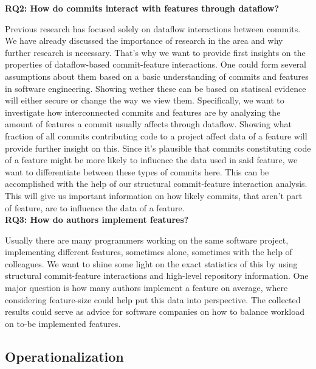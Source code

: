 \textbf{RQ2: How do commits interact with features through dataflow?}

Previous research has focused solely on dataflow interactions between commits.
We have already discussed the importance of research in the area and why further research is necessary.
That's why we want to provide first insights on the properties of dataflow-based commit-feature interactions.
One could form several assumptions about them based on a basic understanding of commits and features in software engineering.
Showing wether these can be based on statiscal evidence will either secure or change the way we view them.
Specifically, we want to investigate how interconnected commits and features are by analyzing the amount of features a commit usually affects through dataflow.
Showing what fraction of all commits contributing code to a project affect data of a feature will provide further insight on this. 
Since it's plausible that commits constituting code of a feature might be more likely to influence the data used in said feature, we want to differentiate between these types of commits here.
This can be accomplished with the help of our structural commit-feature interaction analysis. 
This will give us important information on how likely commits, that aren't part of feature, are to influence the data of a feature. \\

\textbf{RQ3: How do authors implement features?}

Usually there are many programmers working on the same software project, implementing different features, sometimes alone, sometimes with the help of colleagues.
We want to shine some light on the exact statistics of this by using structural commit-feature interactions and high-level repository information.
One major question is how many authors implement a feature on average, where considering feature-size could help put this data into perspective.
The collected results could serve as advice for software companies on how to balance workload on to-be implemented features. 

\subsection*{Operationalization}\label{sec:operationalization}

